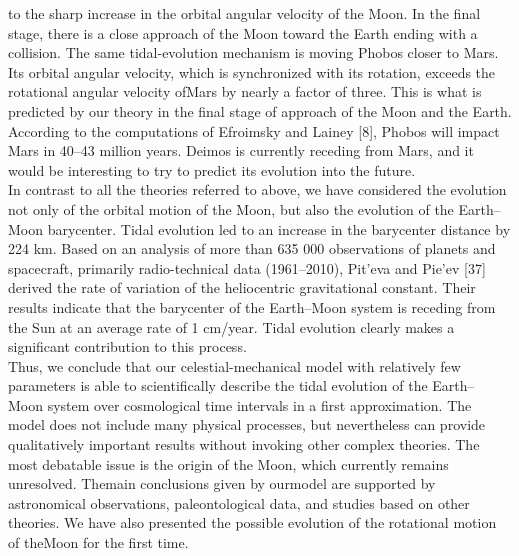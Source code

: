 \documentclass[fontsize = 11pt,a4paper]{article}
\begin{document}
\begin{multicols}{2}
to the sharp increase in the orbital angular velocity
of the Moon. In the final stage, there is a close
approach of the Moon toward the Earth ending with
a collision. The same tidal-evolution mechanism is
moving Phobos closer to Mars. Its orbital angular
velocity, which is synchronized with its rotation, exceeds
the rotational angular velocity ofMars by nearly
a factor of three. This is what is predicted by our
theory in the final stage of approach of the Moon
and the Earth. According to the computations of
Efroimsky and Lainey [8], Phobos will impact Mars
in 40–43 million years. Deimos is currently receding
from Mars, and it would be interesting to try to predict
its evolution into the future. \\
\indent In contrast to all the theories referred to above, we
have considered the evolution not only of the orbital
motion of the Moon, but also the evolution of the
Earth–Moon barycenter. Tidal evolution led to an
increase in the barycenter distance by 224 km. Based
on an analysis of more than 635 000 observations
of planets and spacecraft, primarily radio-technical
data (1961–2010), Pit’eva and Pie’ev [37] derived
the rate of variation of the heliocentric gravitational
constant. Their results indicate that the barycenter of
the Earth–Moon system is receding from the Sun at
an average rate of 1 cm/year. Tidal evolution clearly
makes a significant contribution to this process. \\
\indent Thus, we conclude that our celestial-mechanical
model with relatively few parameters is able to scientifically
describe the tidal evolution of the Earth–
Moon system over cosmological time intervals in a
first approximation. The model does not include
many physical processes, but nevertheless can provide
qualitatively important results without invoking
other complex theories. The most debatable issue
is the origin of the Moon, which currently remains
unresolved. Themain conclusions given by ourmodel
are supported by astronomical observations, paleontological
data, and studies based on other theories.
We have also presented the possible evolution of the
rotational motion of theMoon for the first time.\\

\end{multicols}
\thispagestyle{fancy}
\end{document}
